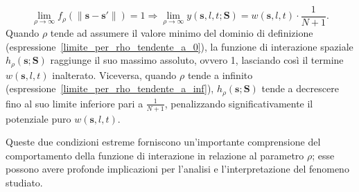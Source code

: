 \begin{equation}
	\lim_{\rho \to \infty} f_\rho(\|\mathbf{s} - \mathbf{s}'\|) = 1
	\Rightarrow \lim_{\rho \to \infty} y(\mathbf{s}, l, t; \mathbf{S}) = w(\mathbf{s}, l, t)\cdot\frac{1}{N + 1} .
	\label{limite_per_rho_tendente_a_inf}
\end{equation}
Quando $\rho$ tende ad assumere il valore minimo del dominio di definizione (espressione~\ref{limite_per_rho_tendente_a_0}), la funzione di interazione spaziale $h_\rho(\mathbf{s};\mathbf{S})$ raggiunge il suo massimo assoluto, ovvero \num{1}, lasciando così il termine $w(\mathbf{s}, l, t)$ inalterato. Viceversa, quando 
$\rho$ tende a infinito (espressione~\ref{limite_per_rho_tendente_a_inf}), $h_\rho(\mathbf{s};\mathbf{S})$ tende a decrescere fino al suo limite inferiore pari a $\frac{1}{N+1}$, penalizzando significativamente il potenziale puro $w(\mathbf{s}, l, t)$.\par Queste due condizioni estreme forniscono un'importante comprensione del comportamento della funzione di interazione in relazione al parametro $\rho$; esse possono avere profonde implicazioni per l'analisi e l'interpretazione del fenomeno studiato.

